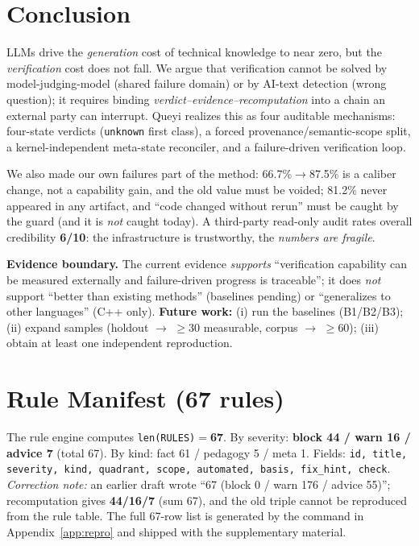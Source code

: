 \documentclass{article}
\begin{document}
\section{Conclusion}
\label{sec:conclusion}
LLMs drive the \emph{generation} cost of technical knowledge to near zero, but the
\emph{verification} cost does not fall. We argue that verification cannot be solved by
model-judging-model (shared failure domain) or by AI-text detection (wrong question); it requires
binding \emph{verdict--evidence--recomputation} into a chain an external party can interrupt.
Queyi realizes this as four auditable mechanisms: four-state verdicts (\texttt{unknown} first
class), a forced provenance/semantic-scope split, a kernel-independent meta-state reconciler, and
a failure-driven verification loop.

We also made our own failures part of the method: 66.7\%$\to$87.5\% is a caliber change, not a
capability gain, and the old value must be voided; 81.2\% never appeared in any artifact, and
``code changed without rerun'' must be caught by the guard (and it is \emph{not} caught today). A
third-party read-only audit rates overall credibility \textbf{6/10}: the infrastructure is
trustworthy, the \emph{numbers are fragile}.

\textbf{Evidence boundary.} The current evidence \emph{supports} ``verification capability can be
measured externally and failure-driven progress is traceable''; it does \emph{not} support
``better than existing methods'' (baselines pending) or ``generalizes to other languages'' (C++
only). \textbf{Future work:} (i) run the baselines (B1/B2/B3); (ii) expand samples
(holdout $\to$ $\ge$30 measurable, corpus $\to$ $\ge$60); (iii) obtain at least one independent
reproduction.

\label{page:endmain}%



\newpage
\appendix
\section{Rule Manifest (67 rules)}
\label{app:rules}
The rule engine computes \texttt{len(RULES)}$=$\textbf{67}. By severity: \textbf{block 44 / warn 16
/ advice 7} (total 67). By kind: fact 61 / pedagogy 5 / meta 1. Fields:
\texttt{id, title, severity, kind, quadrant, scope, automated, basis, fix\_hint, check}.
\emph{Correction note:} an earlier draft wrote ``67 (block 0 / warn 176 / advice 55)''; recomputation
gives \textbf{44/16/7} (sum 67), and the old triple cannot be reproduced from the rule table. The
full 67-row list is generated by the command in Appendix~\ref{app:repro} and shipped with the
supplementary material.
\end{document}
